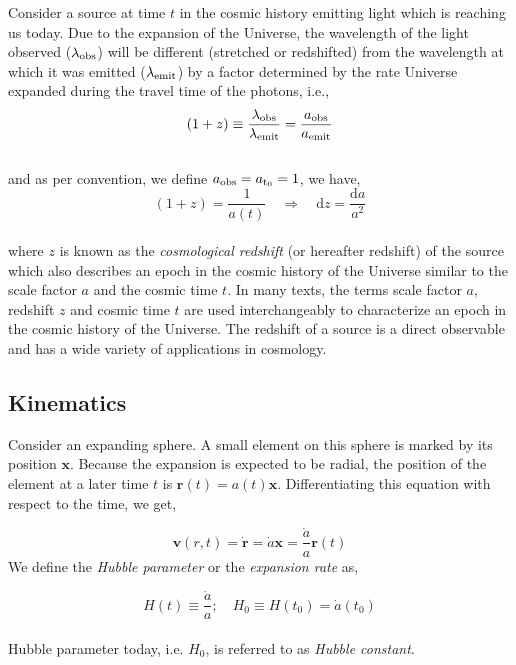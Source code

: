 Consider a source at time $t$ in the cosmic history emitting light which is reaching us today. 
Due to the expansion of the Universe, the wavelength of the light observed 
($\lambda_{\rm obs}$) will be different (stretched or redshifted) from the 
wavelength at which it was emitted ($\lambda_{\rm emit}$) by a factor determined by the rate 
Universe expanded during the travel time of the photons, i.e.,
\begin{equation}
	(1+z) \equiv \dfrac{\lambda_{\rm obs}}{\lambda_{\rm emit}} = \dfrac{a_{\rm obs}}{a_{\rm emit}}
\end{equation}
\\
and as per convention, we define $a_{\rm obs} = a_{\rm t_0} = 1$, we have,
\begin{equation}
	(1+z) = \dfrac{1}{a(t)} \quad \Rightarrow \quad \mathrm{d}z = \dfrac{\mathrm{d}a}{a^2}
\end{equation}
\\
where $z$ is known as the {\it cosmological redshift} (or hereafter redshift) 
of the source which also describes
an epoch in the cosmic history of the Universe similar to the scale factor $a$ and
the cosmic time $t$. In many texts, the terms scale factor 
$a$, redshift $z$ and cosmic time $t$ are used interchangeably to
characterize an epoch in the cosmic history of the Universe. The redshift
of a source is a direct observable and has a wide variety of 
applications in cosmology.



\subsection{Kinematics}


Consider an expanding sphere. A small element on this sphere is marked by
its position $\mathbf{x}$. Because the expansion is expected to be radial, the
position of the element at a later time $t$ is $\mathbf{r}(t) = a(t) \mathbf{x}$. Differentiating 
this equation with respect to the time, we get,

\begin{equation}
	\mathbf{v}(r,t) = \dot{\mathbf{r}} = \dot{a} \mathbf{x} = \dfrac{\dot{a}}{a} \mathbf{r}(t)
	\label{eqn:hubble}
\end{equation}
We define the {\em Hubble parameter} or the {\em expansion rate} as,

\begin{equation}
	H(t) \equiv \dfrac{\dot{a}}{a};\quad H_0 \equiv H(t_0) = \dot{a}(t_0)
\end{equation}
\\
Hubble parameter today, i.e. $H_0$, is referred to as {\em Hubble constant}. 


